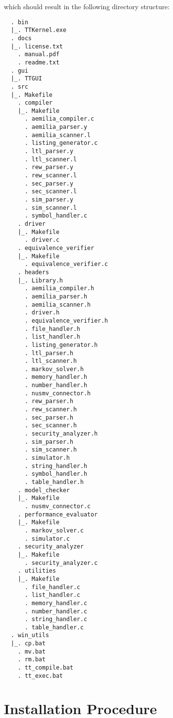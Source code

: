 \noindent which should result in the following directory structure:

	\begin{verbatim}
  . bin
  |_. TTKernel.exe
  . docs
  |_. license.txt
    . manual.pdf
    . readme.txt
  . gui
  |_. TTGUI
  . src
  |_. Makefile
    . compiler
    |_. Makefile
      . aemilia_compiler.c
      . aemilia_parser.y
      . aemilia_scanner.l
      . listing_generator.c
      . ltl_parser.y
      . ltl_scanner.l
      . rew_parser.y
      . rew_scanner.l
      . sec_parser.y
      . sec_scanner.l
      . sim_parser.y
      . sim_scanner.l
      . symbol_handler.c
    . driver
    |_. Makefile
      . driver.c
    . equivalence_verifier
    |_. Makefile
      . equivalence_verifier.c
    . headers
    |_. Library.h
      . aemilia_compiler.h
      . aemilia_parser.h
      . aemilia_scanner.h
      . driver.h
      . equivalence_verifier.h
      . file_handler.h
      . list_handler.h
      . listing_generator.h
      . ltl_parser.h
      . ltl_scanner.h
      . markov_solver.h
      . memory_handler.h
      . number_handler.h
      . nusmv_connector.h
      . rew_parser.h
      . rew_scanner.h
      . sec_parser.h
      . sec_scanner.h
      . security_analyzer.h
      . sim_parser.h
      . sim_scanner.h
      . simulator.h
      . string_handler.h
      . symbol_handler.h
      . table_handler.h
    . model_checker
    |_. Makefile
      . nusmv_connector.c
    . performance_evaluator
    |_. Makefile
      . markov_solver.c
      . simulator.c
    . security_analyzer
    |_. Makefile
      . security_analyzer.c
    . utilities
    |_. Makefile
      . file_handler.c
      . list_handler.c
      . memory_handler.c
      . number_handler.c
      . string_handler.c
      . table_handler.c
  . win_utils
  |_. cp.bat
    . mv.bat
    . rm.bat
    . tt_compile.bat
    . tt_exec.bat
	\end{verbatim}



\section{Installation Procedure}

